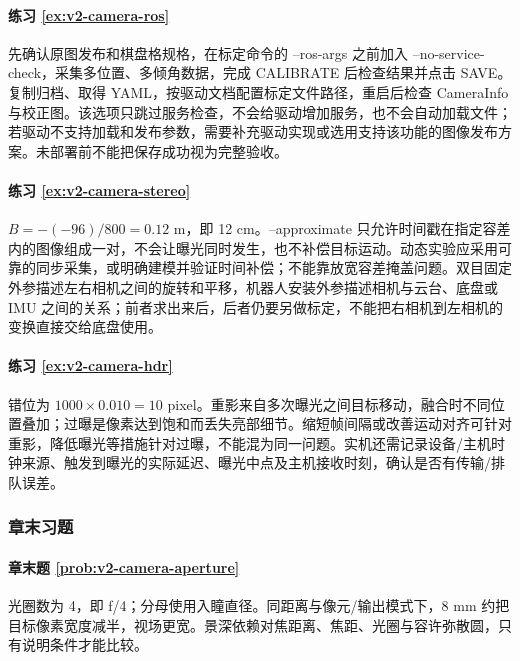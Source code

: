 \paragraph*{练习 \ref{ex:v2-camera-ros}}
\begin{solution}
先确认原图发布和棋盘格规格，在标定命令的 --ros-args 之前加入 --no-service-check，采集多位置、多倾角数据，完成 CALIBRATE 后检查结果并点击 SAVE。复制归档、取得 YAML，按驱动文档配置标定文件路径，重启后检查 CameraInfo 与校正图。该选项只跳过服务检查，不会给驱动增加服务，也不会自动加载文件；若驱动不支持加载和发布参数，需要补充驱动实现或选用支持该功能的图像发布方案。未部署前不能把保存成功视为完整验收。
\end{solution}

\paragraph*{练习 \ref{ex:v2-camera-stereo}}
\begin{solution}
$B=-(-96)/800=0.12$ m，即 12 cm。--approximate 只允许时间戳在指定容差内的图像组成一对，不会让曝光同时发生，也不补偿目标运动。动态实验应采用可靠的同步采集，或明确建模并验证时间补偿；不能靠放宽容差掩盖问题。双目固定外参描述左右相机之间的旋转和平移，机器人安装外参描述相机与云台、底盘或 IMU 之间的关系；前者求出来后，后者仍要另做标定，不能把右相机到左相机的变换直接交给底盘使用。
\end{solution}

\paragraph*{练习 \ref{ex:v2-camera-hdr}}
\begin{solution}
错位为 $1000\times0.010=10$ pixel。重影来自多次曝光之间目标移动，融合时不同位置叠加；过曝是像素达到饱和而丢失亮部细节。缩短帧间隔或改善运动对齐可针对重影，降低曝光等措施针对过曝，不能混为同一问题。实机还需记录设备/主机时钟来源、触发到曝光的实际延迟、曝光中点及主机接收时刻，确认是否有传输/排队误差。
\end{solution}

\subsubsection*{章末习题}

\paragraph*{章末题 \ref{prob:v2-camera-aperture}}
\begin{solution}
光圈数为 4，即 f/4；分母使用入瞳直径。同距离与像元/输出模式下，8 mm 约把目标像素宽度减半，视场更宽。景深依赖对焦距离、焦距、光圈与容许弥散圆，只有说明条件才能比较。
\end{solution}

